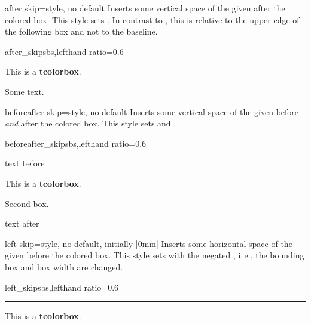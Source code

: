 \begin{docTcbKey}[][doc new and updated={2020-09-25}{2017-02-01}]{after skip}{=}{style, no default}
  Inserts some vertical space of the given  after the colored box.
  This style sets .
  In contrast to , this  is
  relative to the upper edge of the following box and not to the baseline.
\begin{exdispExample*}{after_skip}{sbs,lefthand ratio=0.6}
\begin{tcolorbox}[after skip=1cm,
    colframe=red!50!white]
  This is a \textbf{tcolorbox}.
\end{tcolorbox}
Some text.
\end{exdispExample*}
\end{docTcbKey}

\begin{docTcbKey}[][doc new=2014-10-10]{beforeafter skip}{=}{style, no default}
  Inserts some vertical space of the given  before \emph{and} after the colored box.
  This style sets  and .
\begin{exdispExample*}{beforeafter_skip}{sbs,lefthand ratio=0.6}

text before
\begin{tcolorbox}
  This is a \textbf{tcolorbox}.
\end{tcolorbox}
\begin{tcolorbox}
  Second box.
\end{tcolorbox}
text after
\end{exdispExample*}
\end{docTcbKey}


\clearpage

\begin{docTcbKey}[][doc new=2014-11-07]{left skip}{=}{style, no default, initially |0mm|}
  Inserts some horizontal space of the given  before the colored box.
  This style sets  with the negated ,
  i.\,e., the bounding box and box width are changed.
\begin{exdispExample*}{left_skip}{sbs,lefthand ratio=0.6}
\noindent\rule{\linewidth}{2pt}

\begin{tcolorbox}[left skip=1cm,
    colframe=red!50!white]
  This is a \textbf{tcolorbox}.
\end{tcolorbox}
\end{exdispExample*}
\end{docTcbKey}

